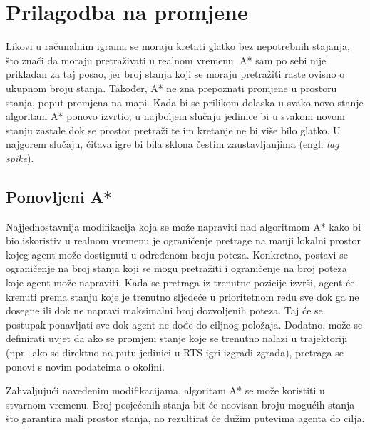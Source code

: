 \documentclass[times, utf8, zavrsni, numeric]{fer}
\begin{document}

\section{Prilagodba na promjene}\label{sec:adaptation}

\par Likovi u računalnim igrama se moraju kretati glatko bez nepotrebnih stajanja, što znači da moraju pretraživati u realnom vremenu. 
A* sam po sebi nije prikladan za taj posao, jer broj stanja koji se moraju pretražiti raste ovisno o ukupnom broju stanja. 
Također, A* ne zna prepoznati promjene u prostoru stanja, poput promjena na mapi. Kada bi se prilikom dolaska u svako novo stanje algoritam A* ponovo izvrtio, u najboljem slučaju jedinice bi u svakom novom stanju zastale dok se prostor pretraži te im kretanje ne bi više bilo glatko. 
U najgorem slučaju, čitava igre bi bila sklona čestim zaustavljanjima (engl. \textit{lag spike}).

\subsection{Ponovljeni A*}

\par Najjednostavnija modifikacija koja se može napraviti nad algoritmom A* kako bi bio iskoristiv u realnom vremenu je ograničenje pretrage na manji lokalni prostor kojeg agent može dostignuti u određenom broju poteza. 
Konkretno, postavi se ograničenje na broj stanja koji se mogu pretražiti i ograničenje na broj poteza koje agent može napraviti.
Kada se pretraga iz trenutne pozicije izvrši, agent će krenuti prema stanju koje je trenutno sljedeće u prioritetnom redu sve dok ga ne dosegne ili dok ne napravi maksimalni broj dozvoljenih poteza.
Taj će se postupak ponavljati sve dok agent ne dođe do ciljnog položaja.
Dodatno, može se definirati uvjet da ako se promjeni stanje koje se trenutno nalazi u trajektoriji (npr.\ ako se direktno na putu jedinici u RTS igri izgradi zgrada), pretraga se ponovi s novim podatcima o okolini.

\par Zahvaljujući navedenim modifikacijama, algoritam A* se može koristiti u stvarnom vremenu. 
Broj posjećenih stanja bit će neovisan broju mogućih stanja što garantira mali prostor stanja, no rezultirat će dužim putevima agenta do cilja.
\end{document}
